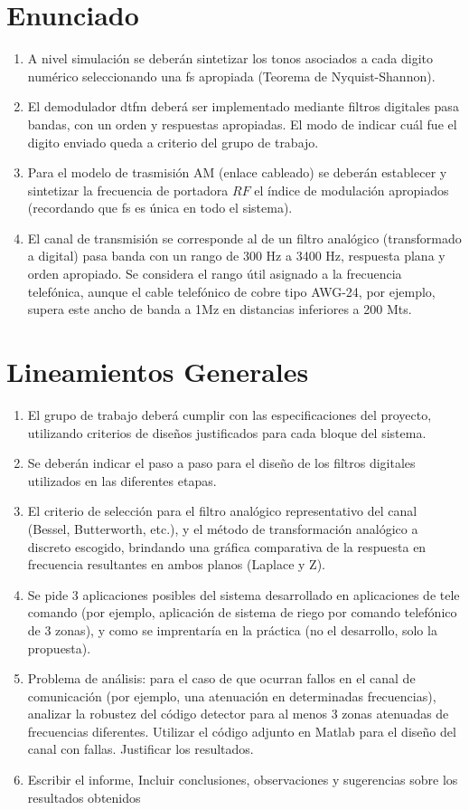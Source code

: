 \section{Enunciado}
\begin{enumerate}[label=\alph*)]
  \item A nivel simulación se deberán sintetizar los tonos asociados a cada digito numérico seleccionando una \gls{fs} apropiada (Teorema de Nyquist-Shannon).
  \item El demodulador \gls{dtfm} deberá ser implementado mediante filtros digitales pasa bandas, con un orden y respuestas apropiadas. El modo de indicar cuál fue el digito enviado queda a criterio del grupo de trabajo.
  \item Para el modelo de trasmisión AM (enlace cableado) se deberán establecer y sintetizar la frecuencia de portadora $RF$ el índice de modulación apropiados (recordando que \gls{fs} es única en todo el sistema).
  \item El canal de transmisión se corresponde al de un filtro analógico (transformado a digital) pasa banda con un rango de 300 Hz a 3400 Hz, respuesta plana y orden apropiado. Se considera el rango útil asignado a la frecuencia telefónica, aunque el cable         telefónico de cobre tipo AWG-24, por ejemplo, supera este ancho de banda a 1Mz en distancias inferiores a 200 Mts.
\end{enumerate}

\section{Lineamientos Generales}
\begin{enumerate}[label=\alph*)]
  \item El grupo de trabajo deberá cumplir con las especificaciones del proyecto, utilizando criterios de diseños justificados para cada bloque del sistema.
  \item Se deberán indicar el paso a paso para el diseño de los filtros digitales utilizados en las diferentes etapas.
  \item El criterio de selección para el filtro analógico representativo del canal (Bessel, Butterworth, etc.), y el método de transformación analógico a discreto escogido, brindando una gráfica comparativa de la respuesta en frecuencia resultantes en ambos planos (Laplace y Z).
  \item Se pide 3 aplicaciones posibles del sistema desarrollado en aplicaciones de tele comando (por ejemplo, aplicación de sistema de riego por comando telefónico de 3 zonas), y como se imprentaría en la práctica (no el desarrollo, solo la propuesta).
  \item Problema de análisis: para el caso de que ocurran fallos en el canal de comunicación (por ejemplo, una atenuación en determinadas frecuencias), analizar la robustez del código detector para al menos 3 zonas atenuadas de frecuencias diferentes. Utilizar el código adjunto en Matlab para el diseño del canal con fallas. Justificar los resultados.
  \item Escribir el informe, Incluir conclusiones, observaciones y sugerencias sobre los resultados obtenidos
\end{enumerate}

